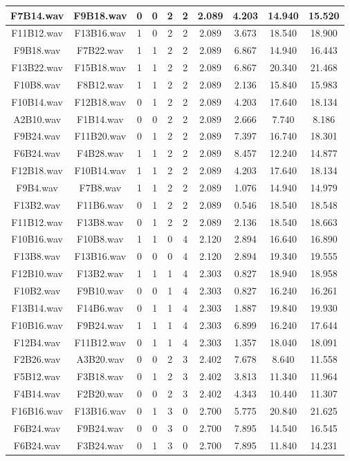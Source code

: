 \documentclass[11pt,a4paper]{book}
\begin{document}
\begin{longtable}[c]{|c|c|c|c|c|c|c|c|c|c|}
F7B14.wav&F9B18.wav&0&0&2&2&2.089&4.203&14.940&15.520\\ \hline
F11B12.wav&F13B16.wav&1&0&2&2&2.089&3.673&18.540&18.900\\ \hline
F9B18.wav&F7B22.wav&1&1&2&2&2.089&6.867&14.940&16.443\\ \hline
F13B22.wav&F15B18.wav&1&1&2&2&2.089&6.867&20.340&21.468\\ \hline
F10B8.wav&F8B12.wav&1&1&2&2&2.089&2.136&15.840&15.983\\ \hline
F10B14.wav&F12B18.wav&0&1&2&2&2.089&4.203&17.640&18.134\\ \hline
A2B10.wav&F1B14.wav&0&0&2&2&2.089&2.666&7.740&8.186\\ \hline
F9B24.wav&F11B20.wav&0&1&2&2&2.089&7.397&16.740&18.301\\ \hline
F6B24.wav&F4B28.wav&1&1&2&2&2.089&8.457&12.240&14.877\\ \hline
F12B18.wav&F10B14.wav&1&1&2&2&2.089&4.203&17.640&18.134\\ \hline
F9B4.wav&F7B8.wav&1&1&2&2&2.089&1.076&14.940&14.979\\ \hline
F13B2.wav&F11B6.wav&0&1&2&2&2.089&0.546&18.540&18.548\\ \hline
F11B12.wav&F13B8.wav&0&1&2&2&2.089&2.136&18.540&18.663\\ \hline
F10B16.wav&F10B8.wav&1&1&0&4&2.120&2.894&16.640&16.890\\ \hline
F13B8.wav&F13B16.wav&0&0&0&4&2.120&2.894&19.340&19.555\\ \hline
F12B10.wav&F13B2.wav&1&1&1&4&2.303&0.827&18.940&18.958\\ \hline
F10B2.wav&F9B10.wav&0&0&1&4&2.303&0.827&16.240&16.261\\ \hline
F13B14.wav&F14B6.wav&0&1&1&4&2.303&1.887&19.840&19.930\\ \hline
F10B16.wav&F9B24.wav&1&1&1&4&2.303&6.899&16.240&17.644\\ \hline
F12B4.wav&F11B12.wav&0&1&1&4&2.303&1.357&18.040&18.091\\ \hline
F2B26.wav&A3B20.wav&0&0&2&3&2.402&7.678&8.640&11.558\\ \hline
F5B12.wav&F3B18.wav&0&1&2&3&2.402&3.813&11.340&11.964\\ \hline
F4B14.wav&F2B20.wav&0&0&2&3&2.402&4.343&10.440&11.307\\ \hline
F16B16.wav&F13B16.wav&0&1&3&0&2.700&5.775&20.840&21.625\\ \hline
F6B24.wav&F9B24.wav&0&0&3&0&2.700&7.895&14.540&16.545\\ \hline
F6B24.wav&F3B24.wav&0&1&3&0&2.700&7.895&11.840&14.231\\ \hline

\end{longtable}
\end{document}

